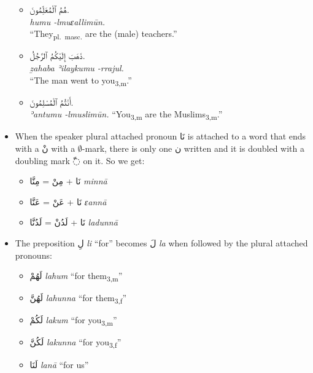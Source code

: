 \documentclass[
  10pt,
]{book}
\providecommand{\tightlist}{%
  \setlength{\itemsep}{0pt}\setlength{\parskip}{0pt}}
\begin{document}
\begin{itemize}
  \begin{itemize}
  \tightlist
  \item
    \foreignlanguage{arabic}{هُمُ ٱلْمُعَلِّمُونَ.}\\
    \emph{humu -lmuɛallimūn.}\\
    \enquote{They\textsubscript{pl.~masc.} are the (male) teachers.}
  \item
    \foreignlanguage{arabic}{ذَهَبَ إِلَيْکُمُ ٱلرَّجُلُ.}\\
    \emph{ẕahaba ʾilaykumu -rrajul.}\\
    \enquote{The man went to you\textsubscript{3,m}.}
  \item
    \foreignlanguage{arabic}{أَنْتُمُ ٱلْمُسْلِمُونَ.}\\
    \emph{ʾantumu -lmuslimūn.}
    \enquote{You\textsubscript{3,m} are the Muslims\textsubscript{3,m}.}
  \end{itemize}
\item
  When the speaker plural attached pronoun \foreignlanguage{arabic}{نَا} is attached to a word that ends with a \foreignlanguage{arabic}{نْ} with a \(\emptyset\)-mark, there is only one \foreignlanguage{arabic}{ن} written and it is doubled with a doubling mark \foreignlanguage{arabic}{◌ّ} on it. So we get:

  \begin{itemize}
  \tightlist
  \item
    \foreignlanguage{arabic}{نَا} + \foreignlanguage{arabic}{مِنْ} = \foreignlanguage{arabic}{مِنَّا} \emph{minnā}
  \item
    \foreignlanguage{arabic}{نَا} + \foreignlanguage{arabic}{عَنْ} = \foreignlanguage{arabic}{عَنَّا} \emph{ɛannā}
  \item
    \foreignlanguage{arabic}{نَا} + \foreignlanguage{arabic}{لَدُنْ} = \foreignlanguage{arabic}{لَدُنَّا} \emph{ladunnā}
  \end{itemize}
\item
  The preposition \foreignlanguage{arabic}{لِ} \emph{li} \enquote{for} becomes \foreignlanguage{arabic}{لَ} \emph{la} when followed by the plural attached pronouns:

  \begin{itemize}
  \tightlist
  \item
    \foreignlanguage{arabic}{لَهُمْ} \emph{lahum} \enquote{for them\textsubscript{3,m}}
  \item
    \foreignlanguage{arabic}{لَهُنَّ} \emph{lahunna} \enquote{for them\textsubscript{3,f}}
  \item
    \foreignlanguage{arabic}{لَکُمْ} \emph{lakum} \enquote{for you\textsubscript{3,m}}
  \item
    \foreignlanguage{arabic}{لَکُنَّ} \emph{lakunna} \enquote{for you\textsubscript{3,f}}
  \item
    \foreignlanguage{arabic}{لَنَا} \emph{lanā} \enquote{for us}
  \end{itemize}
\end{itemize}
\end{document}
